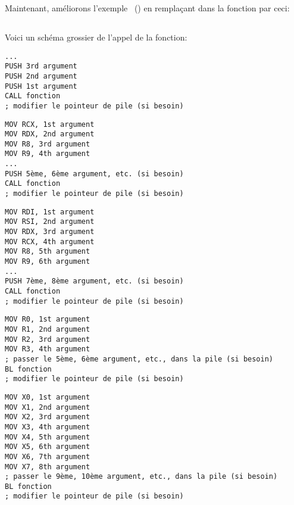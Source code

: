 ﻿\mysection{\PrintfSeveralArgumentsSectionName}

Maintenant, améliorons l'exemple \emph{\HelloWorldSectionName}~()
en remplaçant \printf dans la fonction \main par ceci:







\subsection{\Conclusion{}}

Voici un schéma grossier de l'appel de la fonction:

\begin{lstlisting}[caption=x86,style=customasmx86]
...
PUSH 3rd argument
PUSH 2nd argument
PUSH 1st argument
CALL fonction
; modifier le pointeur de pile (si besoin)
\end{lstlisting}

\begin{lstlisting}[caption=x64 (MSVC),style=customasmx86]
MOV RCX, 1st argument
MOV RDX, 2nd argument
MOV R8, 3rd argument
MOV R9, 4th argument
...
PUSH 5ème, 6ème argument, etc. (si besoin)
CALL fonction
; modifier le pointeur de pile (si besoin)
\end{lstlisting}

\begin{lstlisting}[caption=x64 (GCC),style=customasmx86]
MOV RDI, 1st argument
MOV RSI, 2nd argument
MOV RDX, 3rd argument
MOV RCX, 4th argument
MOV R8, 5th argument
MOV R9, 6th argument
...
PUSH 7ème, 8ème argument, etc. (si besoin)
CALL fonction
; modifier le pointeur de pile (si besoin)
\end{lstlisting}

\begin{lstlisting}[caption=ARM,style=customasmARM]
MOV R0, 1st argument
MOV R1, 2nd argument
MOV R2, 3rd argument
MOV R3, 4th argument
; passer le 5ème, 6ème argument, etc., dans la pile (si besoin)
BL fonction
; modifier le pointeur de pile (si besoin)
\end{lstlisting}

\begin{lstlisting}[caption=ARM64,style=customasmARM]
MOV X0, 1st argument
MOV X1, 2nd argument
MOV X2, 3rd argument
MOV X3, 4th argument
MOV X4, 5th argument
MOV X5, 6th argument
MOV X6, 7th argument
MOV X7, 8th argument
; passer le 9ème, 10ème argument, etc., dans la pile (si besoin)
BL fonction
; modifier le pointeur de pile (si besoin)
\end{lstlisting}

